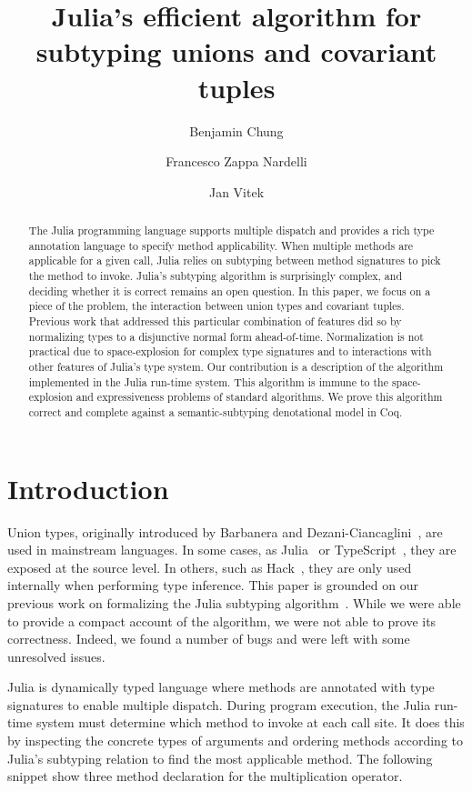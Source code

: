 \documentclass[a4paper,english]{lipics-v2019}
\title{Julia's efficient algorithm for subtyping unions and covariant tuples}
\author{Benjamin Chung}{Northeastern University}{}{}{}%
\author{Francesco Zappa Nardelli}{INRIA}{}{}{}
\author{Jan Vitek}{Northeastern University \& Czech Technical University}{}{}{}
\begin{document}
\maketitle
\begin{abstract}
  The Julia programming language supports multiple dispatch and provides a
  rich type annotation language to specify method applicability. When
  multiple methods are applicable for a given call, Julia relies on
  subtyping between method signatures to pick the method to invoke. Julia's
  subtyping algorithm is surprisingly complex, and deciding whether it is
  correct remains an open question. In this paper, we focus on a piece of
  the problem, the interaction between union types and covariant
  tuples. Previous work that addressed this particular combination of
  features did so by normalizing types to a disjunctive normal form
  ahead-of-time. Normalization is not practical due to space-explosion for
  complex type signatures and to interactions with other features of Julia's
  type system.  Our contribution is a description of the algorithm
  implemented in the Julia run-time system. This algorithm is immune to the
  space-explosion and expressiveness problems of standard algorithms.  We
  prove this algorithm correct and complete against a semantic-subtyping
  denotational model in Coq.
\end{abstract}

\section{Introduction}

Union types, originally introduced by Barbanera and
Dezani-Ciancaglini~\cite{barbanera1991intersection}, are used in mainstream
languages. In some cases, as Julia~\cite{BezansonEKS17} or
TypeScript~\cite{typescript}, they are exposed at the source level. In
others, such as Hack~\cite{hack}, they are only used internally when
performing type inference. This paper is grounded on our previous work on
formalizing the Julia subtyping algorithm~\cite{DBLP:NardelliBPCBV18}.
While we were able to provide a compact account of the algorithm, we were
not able to prove its correctness. Indeed, we found a number of bugs and
were left with some unresolved issues.

Julia is dynamically typed language where methods are annotated with type
signatures to enable multiple dispatch. During program execution, the Julia
run-time system must determine which method to invoke at each call site.  It
does this by inspecting the concrete types of arguments and ordering methods
according to Julia's subtyping relation to find the most applicable method.
The following snippet show three method declaration for the multiplication
operator.
\end{document}
